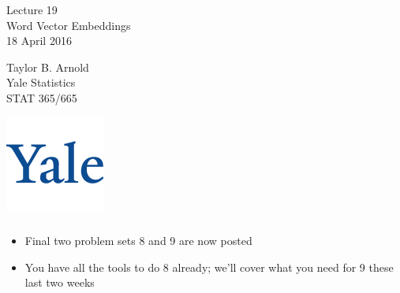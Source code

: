 \documentclass[xetex,mathserif,serif,aspectratio=169]{beamer}
\begin{document}
\begin{frame}[fragile] \frametitle{} \oldB \small

\vfill

{\fontsize{0.7cm}{0cm}\selectfont Lecture 19 \\\vspace{0.2cm}
Word Vector Embeddings}\\\vspace{0.5cm}
18 April 2016

\vspace{2cm}

\begin{minipage}{0.6\textwidth}
Taylor B. Arnold \\
Yale Statistics \\
STAT 365/665
\end{minipage}
\hfill
\begin{minipage}{0.3\textwidth}\raggedleft
\includegraphics[scale=0.3]{../yale-logo.png}
\end{minipage}%

\end{frame}

\begin{frame}[fragile] \frametitle{} \oldB \small


\begin{itemize}
\item Final two problem sets 8 and 9 are now posted
\item You have all the tools to do 8 already; we'll cover
what you need for 9 these last two weeks
\end{itemize}

\end{frame}
\end{document}
